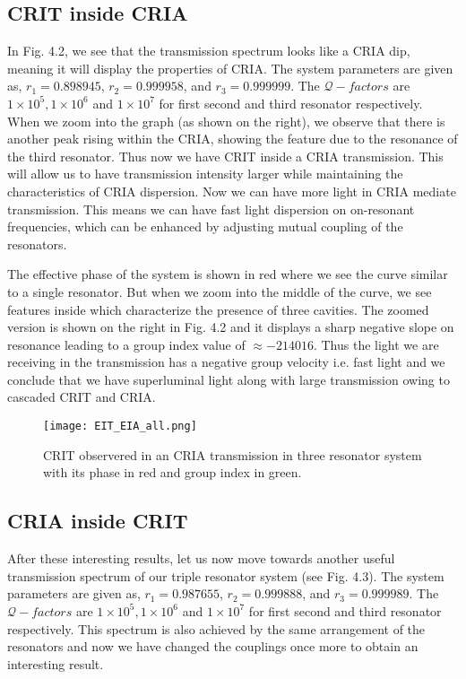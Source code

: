 \subsection{CRIT inside CRIA}
In Fig. 4.2, we see that the transmission spectrum looks like a CRIA dip, meaning it will display the properties of CRIA. The system parameters are given as, $r_{1} = 0.898945$, $r_{2} = 0.999958$, and $r_{3} = 0.999999$. The $\mathcal{Q}-factors$ are $1\times10^{5}, 1\times10^{6}$ and $1\times10^{7}$ for first second and third resonator respectively. When we zoom into the graph (as shown on the right), we observe that there is another peak rising within the CRIA, showing the feature due to the resonance of the third resonator. Thus now we have CRIT inside a CRIA transmission. This will allow us to have transmission intensity larger while maintaining the characteristics of CRIA dispersion. Now we can have more light in CRIA mediate transmission. This means we can have fast light dispersion on on-resonant frequencies, which can be enhanced by adjusting mutual coupling of the resonators.

The effective phase of the system is shown in red where we see the curve similar to a single resonator. But when we zoom into the middle of the curve, we see features inside which characterize the presence of three cavities. The zoomed version is shown on the right in Fig. 4.2 and it displays a sharp negative slope on resonance leading to a group index value of $\approx -214016$. Thus the light we are receiving in the transmission has a negative group velocity i.e. fast light and we conclude that we have superluminal light along with large transmission owing to cascaded CRIT and CRIA.

\begin{figure}[t]
\centering
\texttt{[image: EIT\_EIA\_all.png]}
\caption{CRIT observered in an CRIA transmission in three resonator system with its phase in red and group index in green.}
\end{figure}

\newpage
\subsection{CRIA inside CRIT}

After these interesting results, let us now move towards another useful transmission spectrum of our triple resonator system (see Fig. 4.3). The system parameters are given as, $r_{1} = 0.987655$, $r_{2} = 0.999888$, and $r_{3} = 0.999989$. The $\mathcal{Q}-factors$ are $1\times10^{5}, 1\times10^{6}$ and $1\times10^{7}$ for first second and third resonator respectively. This spectrum is also achieved by the same arrangement of the resonators and now we have changed the couplings once more to obtain an interesting result. 

